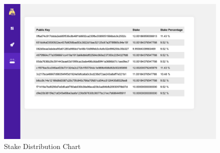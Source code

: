 \begin{figure}[htbp]
    \centering
    \includegraphics[width=0.8\linewidth]{figures/images/ramu/s_stake_dist_chart.png}
	\caption{Stake Distribution Chart}
	\label{fig:ramu_viz_stake_dist_chart}
\end{figure}

